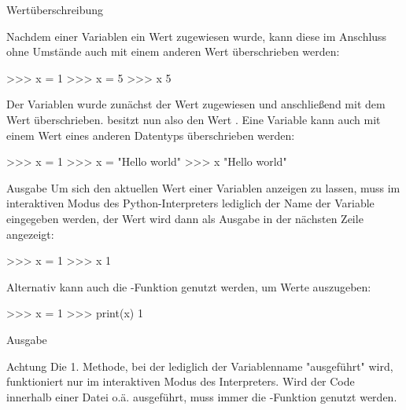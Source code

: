         \begin{frame}[fragile]{Wertüberschreibung}
        
            Nachdem einer Variablen ein Wert zugewiesen wurde, kann diese im Anschluss ohne Umstände auch mit einem anderen Wert überschrieben werden:
  
\begin{pyconcode}
>>> x = 1
>>> x = 5
>>> x
5
\end{pyconcode}
            Der Variablen  wurde zunächst der Wert  zugewiesen und anschließend mit dem Wert  überschrieben.  besitzt nun also den Wert . 
            Eine Variable kann auch mit einem Wert eines anderen Datentyps überschrieben werden:

\begin{pyconcode}
>>> x = 1
>>> x = "Hello world"
>>> x
"Hello world"
\end{pyconcode}

        \end{frame}
        
        \begin{frame}[fragile]{Ausgabe}
            Um sich den aktuellen Wert einer Variablen anzeigen zu lassen, muss im interaktiven Modus des Python-Interpreters lediglich der Name der Variable eingegeben werden, der Wert wird dann als Ausgabe in der nächsten Zeile angezeigt:
\begin{pyconcode}
>>> x = 1
>>> x
1
\end{pyconcode}

            Alternativ kann auch die -Funktion genutzt werden, um Werte auszugeben:
\begin{pyconcode}
>>> x = 1
>>> print(x)
1
\end{pyconcode}

        \end{frame}
        
        \begin{frame}[fragile]{Ausgabe}
            \begin{alertblock}{Achtung}
                Die 1. Methode, bei der lediglich der Variablenname "ausgeführt" wird, funktioniert nur im interaktiven Modus des Interpreters. Wird der Code innerhalb einer Datei o.ä. ausgeführt, muss immer die -Funktion genutzt werden.
            \end{alertblock}
        
        \end{frame}
        
